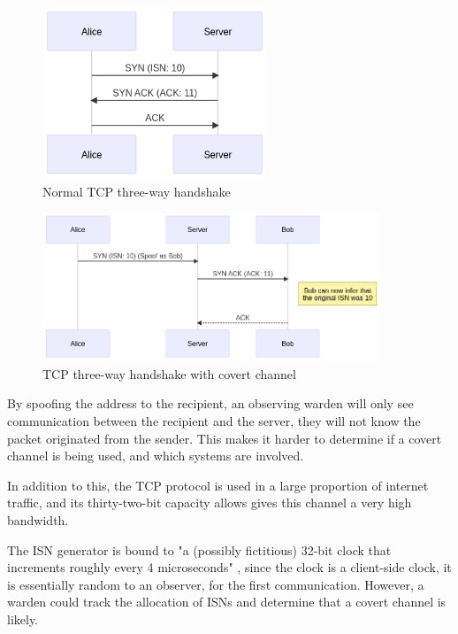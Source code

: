 \begin{figure}[!h]
    \centering
    \includegraphics[width=0.6\textwidth]{fig/TCPACKNormal.png}
    \caption{Normal TCP three-way handshake}
    \label{fig:TCPACKNormal}
\end{figure}

\begin{figure}[!h]
    \centering
    \includegraphics[width=0.9\textwidth]{fig/TCPACKCC.png}
    \caption{TCP three-way handshake with covert channel}
    \label{fig:TCPACKCC}
\end{figure}


By spoofing the address to the recipient, an observing warden will only see communication between the recipient and the server, they will not know the packet originated from the sender. This makes it harder to determine if a covert channel is being used, and which systems are involved.

In addition to this, the TCP protocol is used in a large proportion of internet traffic, and its thirty-two-bit capacity allows gives this channel a very high bandwidth.

The ISN generator is bound to "a (possibly fictitious) 32-bit clock that increments roughly every 4 microseconds" \cite{Trfc793}, since the clock is a client-side clock, it is essentially random to an observer, for the first communication. However, a warden could track the allocation of ISNs and determine that a covert channel is likely.


